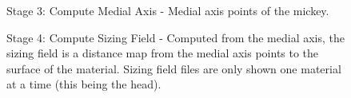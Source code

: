 \documentclass[fleqn,12pt,openany]{book}
\begin{document}
\begin{figure}[htp]
\begin{center}
\end{center}
\caption{\label{fig:MickeyMA}Stage 3: Compute Medial Axis - Medial axis points of the mickey.}
\end{figure} 

\begin{figure}[htp]
\begin{center}
\end{center}
\caption{\label{fig:MickeySF}Stage 4: Compute Sizing Field - Computed from the medial axis, the sizing field is a distance map from the medial axis points to the surface of the material. Sizing field files are only shown one material at a time (this being the head).}
\end{figure} 
\end{document}
